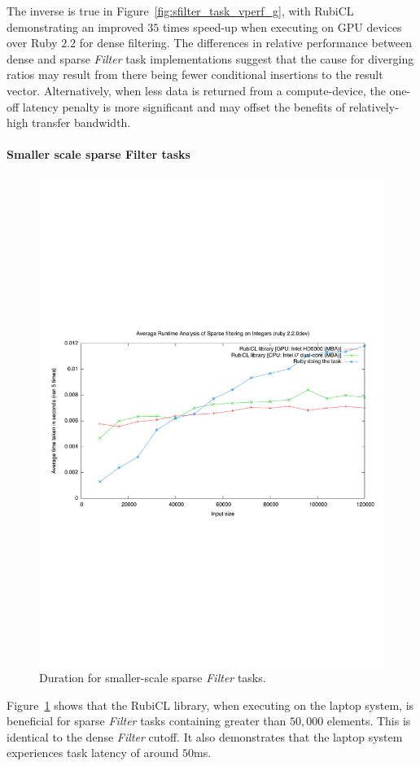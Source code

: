 The inverse is true in Figure~\ref{fig:sfilter_task_vperf_g}, with RubiCL demonstrating an improved $3$\textendash$5$ times speed-up when executing on \ac{GPU} devices over Ruby $2.2$ for dense filtering.
The differences in relative performance between dense and sparse \emph{Filter} task implementations suggest that the cause for diverging ratios may result from there being fewer conditional insertions to the result vector. Alternatively, when less data is returned from a compute-device, the one-off latency penalty is more significant and may offset the benefits of relatively-high transfer bandwidth.

\paragraph*{Smaller scale sparse Filter tasks}
\begin{figure}[H]
  \includegraphics[trim=0cm 8cm 0cm 8cm, clip=true, width=\textwidth]{./graphing/smallsparsefilter.pdf}
  \caption{Duration for smaller-scale sparse \emph{Filter} tasks.}
  \label{fig:sparsefil_tasksmallrun}
\end{figure}
Figure~\ref{fig:sparsefil_tasksmallrun} shows that the RubiCL library, when executing on the laptop system, is beneficial for sparse \emph{Filter} tasks containing greater than $50,000$ elements. This is identical to the dense \emph{Filter} cutoff. It also demonstrates that the laptop system experiences task latency of around $50$ms.

